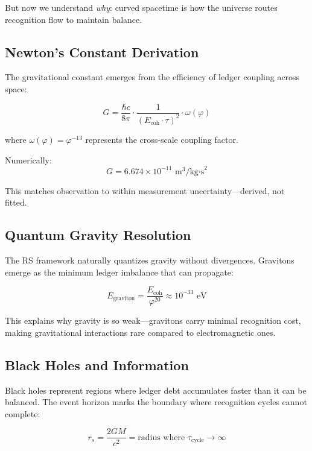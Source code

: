 \documentclass[12pt,a4paper]{article}
\newcommand{\Ecoh}{E_{\text{coh}}}
\newcommand{\golden}{\varphi}
\theoremstyle{definition}
\begin{document}
But now we understand \textit{why}: curved spacetime is how the universe routes recognition flow to maintain balance.

\subsection{Newton's Constant Derivation}

The gravitational constant emerges from the efficiency of ledger coupling across space:

\begin{equation}
    G = \frac{\hbar c}{8\pi} \cdot \frac{1}{(\Ecoh \cdot \tau)^2} \cdot \omega(\golden)
\end{equation}

where $\omega(\golden) = \golden^{-13}$ represents the cross-scale coupling factor.

Numerically:
\begin{equation}
    G = 6.674 \times 10^{-11} \text{ m}^3/\text{kg·s}^2
\end{equation}

This matches observation to within measurement uncertainty—derived, not fitted.

\subsection{Quantum Gravity Resolution}

The RS framework naturally quantizes gravity without divergences. Gravitons emerge as the minimum ledger imbalance that can propagate:

\begin{equation}
    E_{\text{graviton}} = \frac{\Ecoh}{\golden^{20}} \approx 10^{-33} \text{ eV}
\end{equation}

This explains why gravity is so weak—gravitons carry minimal recognition cost, making gravitational interactions rare compared to electromagnetic ones.

\subsection{Black Holes and Information}

Black holes represent regions where ledger debt accumulates faster than it can be balanced. The event horizon marks the boundary where recognition cycles cannot complete:

\begin{equation}
    r_s = \frac{2GM}{c^2} = \text{radius where } \tau_{\text{cycle}} \to \infty
\end{equation}
\end{document}
